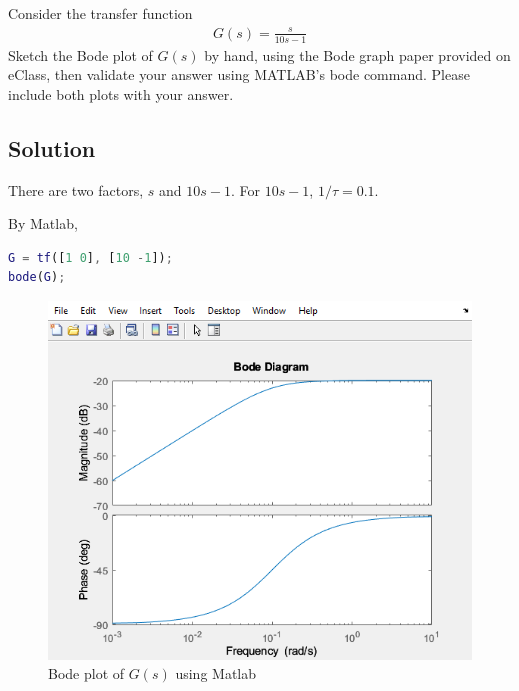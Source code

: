 \section{}
Consider the transfer function
\begin{align*}
    G(s) = \frac{s}{10s - 1}
\end{align*}
Sketch the Bode plot of $G(s)$ by hand, using the Bode graph paper provided on eClass, then validate
your answer using MATLAB's bode command. Please include both plots with your answer.

\subsection*{Solution}
There are two factors, $s$ and $10s - 1$. For $10s-1$, $1/\tau = 0.1$.

By Matlab,
\begin{lstlisting}[language=Matlab]
G = tf([1 0], [10 -1]);
bode(G);
\end{lstlisting}
\begin{figure}[h]
    \centering
    \includegraphics[width=0.8\linewidth]{Questions/Figures/Q1 Matlab Bode.png}
    \caption{Bode plot of $G(s)$ using Matlab}
    \label{fig:Q1 Matlab Bode}
\end{figure}



